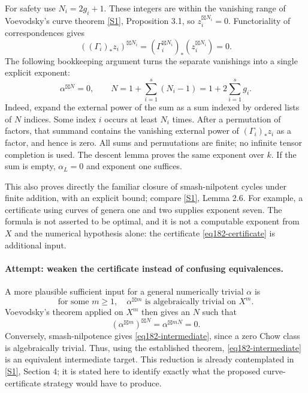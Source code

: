 \documentclass[11pt,a4paper]{article}
\newcommand{\sref}[2]{\hyperlink{source:#1:#2}{[S#2]}}
\numberwithin{equation}{section}
\begin{document}
For safety use $N_i=2g_i+1$. These integers are within the vanishing range
of Voevodsky's curve theorem \sref{statement}{1}, Proposition 3.1, so
$z_i^{\boxtimes N_i}=0$. Functoriality of correspondences gives
\[
 ((\Gamma_i)_*z_i)^{\boxtimes N_i}
             =(\Gamma_i^{\boxtimes N_i})_*
                            (z_i^{\boxtimes N_i})=0.
\]
The following bookkeeping argument turns the separate vanishings into a
single explicit exponent:
\begin{equation}\label{eq182-exponent}
           \alpha^{\boxtimes N}=0,
             \qquad N=1+\sum_{i=1}^s(N_i-1)
                         =1+2\sum_{i=1}^s g_i.
\end{equation}
Indeed, expand the external power of the sum as a sum indexed by ordered
lists of $N$ indices. Some index $i$ occurs at least $N_i$ times. After a
permutation of factors, that summand contains the vanishing external power
of $(\Gamma_i)_*z_i$ as a factor, and hence is zero. All sums and
permutations are finite; no infinite tensor completion is used. The
descent lemma proves the same exponent over $k$. If the sum is empty,
$\alpha_L=0$ and exponent one suffices.

This also proves directly the familiar closure of smash-nilpotent cycles
under finite addition, with an explicit bound; compare
\sref{statement}{1}, Lemma 2.6. For example, a certificate using curves of genera
one and two supplies exponent seven. The formula is not asserted to be
optimal, and it is not a computable exponent from $X$ and the numerical
hypothesis alone: the certificate \eqref{eq182-certificate} is additional
input.

\paragraph{Attempt: weaken the certificate instead of confusing equivalences.}
A more plausible sufficient input for a general numerically trivial
$\alpha$ is
\begin{equation}\label{eq182-intermediate}
 \text{for some }m\ge1,\quad
             \alpha^{\boxtimes m}\text{ is algebraically trivial on }X^m.
\end{equation}
Voevodsky's theorem applied on $X^m$ then gives an $N$ such that
\[
 (\alpha^{\boxtimes m})^{\boxtimes N}
                    =\alpha^{\boxtimes mN}=0.
\]
Conversely, smash-nilpotence gives \eqref{eq182-intermediate}, since a zero
Chow class is algebraically trivial. Thus, using the established theorem,
\eqref{eq182-intermediate} is an equivalent intermediate target. This
reduction is already contemplated in \sref{statement}{1}, Section 4; it is
stated here to identify exactly what the proposed curve-certificate
strategy would have to produce.
\end{document}
